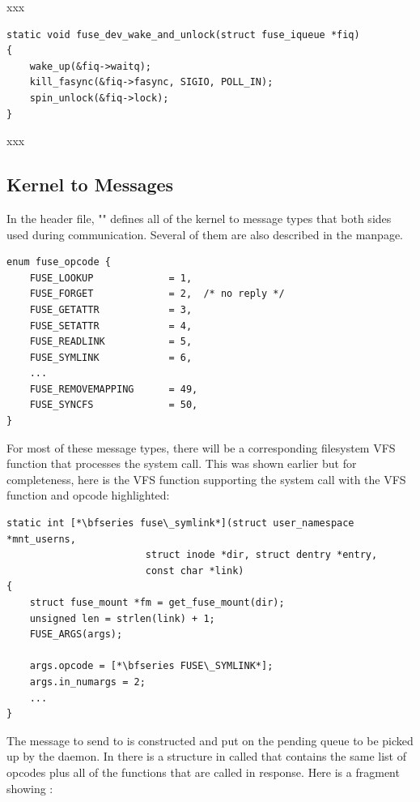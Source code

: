 \noindent
xxx

\begin{lstlisting}
static void fuse_dev_wake_and_unlock(struct fuse_iqueue *fiq)
{
    wake_up(&fiq->waitq);
    kill_fasync(&fiq->fasync, SIGIO, POLL_IN);
    spin_unlock(&fiq->lock);
}
\end{lstlisting}

\noindent
xxx


\subsection{Kernel to  Messages}

In the  header file, "" defines all of the kernel to  message types that both sides used during communication. Several of them are also described in the  manpage.

\begin{lstlisting}
enum fuse_opcode {
    FUSE_LOOKUP             = 1,
    FUSE_FORGET             = 2,  /* no reply */
    FUSE_GETATTR            = 3,
    FUSE_SETATTR            = 4,
    FUSE_READLINK           = 5,
    FUSE_SYMLINK            = 6,
    ...
    FUSE_REMOVEMAPPING      = 49,
    FUSE_SYNCFS             = 50,
}
\end{lstlisting}

\noindent
For most of these message types, there will be a corresponding  filesystem VFS function that processes the system call. This was shown earlier but for completeness, here is the  VFS function supporting the  system call with the VFS function and opcode highlighted:

\begin{lstlisting}
static int [*\bfseries fuse\_symlink*](struct user_namespace *mnt_userns, 
                        struct inode *dir, struct dentry *entry, 
                        const char *link)
{   
    struct fuse_mount *fm = get_fuse_mount(dir);
    unsigned len = strlen(link) + 1;
    FUSE_ARGS(args);
    
    args.opcode = [*\bfseries FUSE\_SYMLINK*];
    args.in_numargs = 2;
    ...
}   
\end{lstlisting}

\noindent
The message to send to  is constructed and put on the pending queue to be picked up by the daemon. In  there is a structure in  called  that contains the same list of opcodes plus all of the functions that are called in response. Here is a fragment showing :

